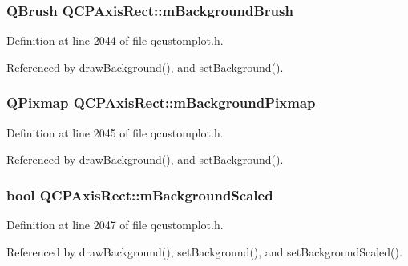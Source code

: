 \subsubsection[{m\+Background\+Brush}]{\setlength{\rightskip}{0pt plus 5cm}Q\+Brush Q\+C\+P\+Axis\+Rect\+::m\+Background\+Brush\hspace{0.3cm}{\ttfamily [protected]}}\label{class_q_c_p_axis_rect_a5748e1a37f63c428e38b0a7724b46259}


Definition at line 2044 of file qcustomplot.\+h.



Referenced by draw\+Background(), and set\+Background().

\hypertarget{class_q_c_p_axis_rect_a38fb1a15f43228a0c124553649303722}{}
\subsubsection[{m\+Background\+Pixmap}]{\setlength{\rightskip}{0pt plus 5cm}Q\+Pixmap Q\+C\+P\+Axis\+Rect\+::m\+Background\+Pixmap\hspace{0.3cm}{\ttfamily [protected]}}\label{class_q_c_p_axis_rect_a38fb1a15f43228a0c124553649303722}


Definition at line 2045 of file qcustomplot.\+h.



Referenced by draw\+Background(), and set\+Background().

\hypertarget{class_q_c_p_axis_rect_a5ad835f0fae5d7cc5ada9e063641dbf1}{}
\subsubsection[{m\+Background\+Scaled}]{\setlength{\rightskip}{0pt plus 5cm}bool Q\+C\+P\+Axis\+Rect\+::m\+Background\+Scaled\hspace{0.3cm}{\ttfamily [protected]}}\label{class_q_c_p_axis_rect_a5ad835f0fae5d7cc5ada9e063641dbf1}


Definition at line 2047 of file qcustomplot.\+h.



Referenced by draw\+Background(), set\+Background(), and set\+Background\+Scaled().

